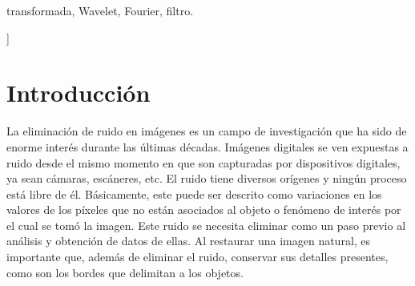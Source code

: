 \documentclass[a4paper,10pt,twocolumn]{article}
\begin{document}
\begin{keywords}
	transformada,
	Wavelet,
	Fourier,
	filtro.
\end{keywords}


\vspace{0.8cm}
]


\section{Introducción}\label{sec:intro}
 La eliminación de ruido en imágenes es un campo de investigación que ha sido de enorme interés durante las últimas décadas. Imágenes digitales se ven expuestas a ruido desde el mismo momento en que son capturadas por dispositivos digitales, ya sean cámaras, escáneres, etc. El ruido tiene diversos orígenes y ningún proceso está libre de él. Básicamente, este puede ser descrito como variaciones en los valores de los píxeles que no están asociados al objeto o fenómeno de interés por el cual se tomó la imagen. Este ruido se necesita eliminar como un paso previo al análisis y obtención de datos de ellas. Al restaurar una imagen natural, es importante que, además de eliminar el ruido, conservar sus detalles presentes, como son los bordes que delimitan a los objetos.
  
\end{document}
